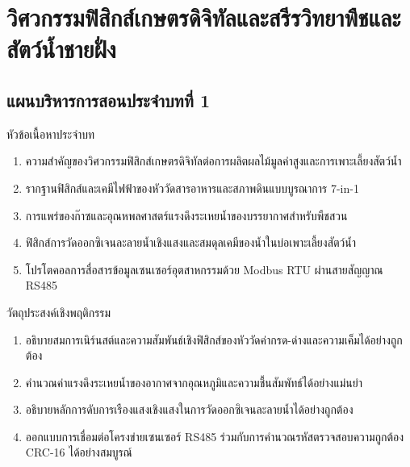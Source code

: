 \chapter{วิศวกรรมฟิสิกส์เกษตรดิจิทัลและสรีรวิทยาพืชและสัตว์น้ำชายฝั่ง}
\label{chap:ch01}

\section*{แผนบริหารการสอนประจำบทที่ 1}

\begin{planbox}{หัวข้อเนื้อหาประจำบท}
\begin{enumerate}[topsep=2pt, itemsep=1pt, partopsep=0pt, parsep=0pt, leftmargin=1.5em]
    \item ความสำคัญของวิศวกรรมฟิสิกส์เกษตรดิจิทัลต่อการผลิตผลไม้มูลค่าสูงและการเพาะเลี้ยงสัตว์น้ำ
    \item รากฐานฟิสิกส์และเคมีไฟฟ้าของหัววัดสารอาหารและสภาพดินแบบบูรณาการ 7-in-1
    \item การแพร่ของก๊าซและอุณหพลศาสตร์แรงดึงระเหยน้ำของบรรยากาศสำหรับพืชสวน
    \item ฟิสิกส์การวัดออกซิเจนละลายน้ำเชิงแสงและสมดุลเคมีของน้ำในบ่อเพาะเลี้ยงสัตว์น้ำ
    \item โปรโตคอลการสื่อสารข้อมูลเซนเซอร์อุตสาหกรรมด้วย Modbus RTU ผ่านสายสัญญาณ RS485
\end{enumerate}
\end{planbox}

\begin{planbox}{วัตถุประสงค์เชิงพฤติกรรม}
\begin{enumerate}[topsep=2pt, itemsep=1pt, partopsep=0pt, parsep=0pt, leftmargin=1.5em]
    \item อธิบายสมการเนิร์นสต์และความสัมพันธ์เชิงฟิสิกส์ของหัววัดค่ากรด-ด่างและความเค็มได้อย่างถูกต้อง
    \item คำนวณค่าแรงดึงระเหยน้ำของอากาศจากอุณหภูมิและความชื้นสัมพัทธ์ได้อย่างแม่นยำ
    \item อธิบายหลักการดับการเรืองแสงเชิงแสงในการวัดออกซิเจนละลายน้ำได้อย่างถูกต้อง
    \item ออกแบบการเชื่อมต่อโครงข่ายเซนเซอร์ RS485 ร่วมกับการคำนวณรหัสตรวจสอบความถูกต้อง CRC-16 ได้อย่างสมบูรณ์
\end{enumerate}
\end{planbox}

